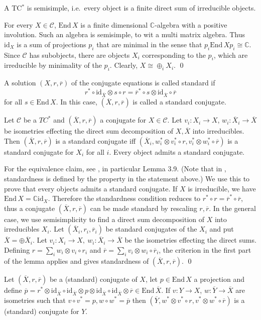 \documentclass[12pt]{article}
\theoremstyle{definition}
\theoremstyle{definition}
\theoremstyle{remark}
\def\2#1{{\mathcal #1}}
\def\7#1{{\mathbb #1}}
\def\ol#1{{\overline #1}}
\newcommand{\End}{\mathrm{End}}
\newcommand{\mcirc}{\circ}
\newcommand{\rarr}{\rightarrow}
\def\id{\mathrm{id}}
\begin{document}
\blemma \label{lem-semisim} 
A TC$^*$ is semisimple, i.e.\ every object is a finite direct sum of irreducible objects.
\elemma

\prf For every $X\in\2C$, $\End\,X$ is a finite dimensional $\7C$-algebra with a positive
involution. Such an algebra is semisimple, to wit a multi matrix algebra. Thus $\id_X$ is a sum of
projections $p_i$ that are minimal in the sense that $p_i\End\,Xp_i\cong\7C$. Since $\2C$ has
subobjects, there are objects $X_i$ corresponding to the $p_i$, which are irreducible by minimality
of the $p_i$. Clearly, $X\cong\oplus_iX_i$.
\qed

\bdefin {}
A solution $(X,r,\ol{r})$ of the conjugate equations is called standard if
\[ r^* \mcirc \id_{\ol{X}}\otimes s\mcirc r= \ol{r}^*\circ s\otimes\id_{\ol{X}}\circ\ol{r} \]
for all $s\in\End\,X$. In this case, $(\ol{X},r,\ol{r})$ is called a standard conjugate.
\edefin

\blemma \label{lem-stand1}
Let $\2C$ be a $TC^*$ and $(\ol{X},r,\ol{r})$ a conjugate for $X\in\2C$. Let $v_i:X_i\rarr X$,
$w_i:\ol{X_i}\rarr\ol{X}$ be isometries effecting the direct sum decomposition of $X,\ol{X}$ into
irreducibles. Then $(\ol{X},r,\ol{r})$ is a standard conjugate iff
$(\ol{X_i},w_i^*\otimes v_i^*\circ r,v_i^*\otimes w_i^*\circ\ol{r})$ 
is a standard conjugate for $X_i$ for all $i$. Every object admits a standard conjugate.
\elemma

\prf For the equivalence claim, see \cite{LR}, in particular Lemma 3.9. (Note that in \cite{LR},
standardness is defined by the property in the statement above.) We use this to prove that every
objects admits a standard conjugate. If $X$ is irreducible, we have $\End\,X=\7C\id_X$. Therefore
the standardness condition reduces to $r^*\circ r=\ol{r}^*\circ\ol{r}$, thus a conjugate
$(\ol{X},r,\ol{r})$ can be made standard by rescaling $r,\ol{r}$. In the general case, we use
semisimplicity to find a direct sum decomposition of $X$ into irreducibles $X_i$.  
Let $(\ol{X_i},r_i,\ol{r}_i)$ be standard conjugates of the $X_i$ and put $\ol{X}=\oplus\ol{X}_i$.
Let $v_i:X_i\rarr X,\ w_i:\ol{X}_i\rarr\ol{X}$ be the isometries effecting the direct sums. Defining
$r=\sum_i w_i\otimes v_i\circ r_i$ and $\ol{r}=\sum_i v_i\otimes w_i\circ\ol{r}_i$, the criterion in
the first part of the lemma applies and gives standardness of $(\ol{X},r,\ol{r})$.
\qed

\blemma \label{lem-conj}
Let $(\ol{X},r,\ol{r})$ be a (standard) conjugate of $X$, let $p\in\End\,X$ a projection and define
$\ol{p}=r^*\otimes\id_{\ol{X}}\mcirc\id_{\ol{X}}\otimes p\otimes\id_{\ol{X}}\mcirc\id_{\ol{X}}\otimes\ol{r}\in\End\,\ol{X}$.
If $v: Y\rarr X$, $w:\ol{Y}\rarr\ol{X}$ are isometries such that $v\circ v^*=p, w\circ w^*=\ol{p}$ then
$(\ol{Y},w^*\otimes v^*\mcirc r,v^*\otimes w^*\mcirc\ol{r})$ is a (standard) conjugate for $Y$.
\elemma
\end{document}
